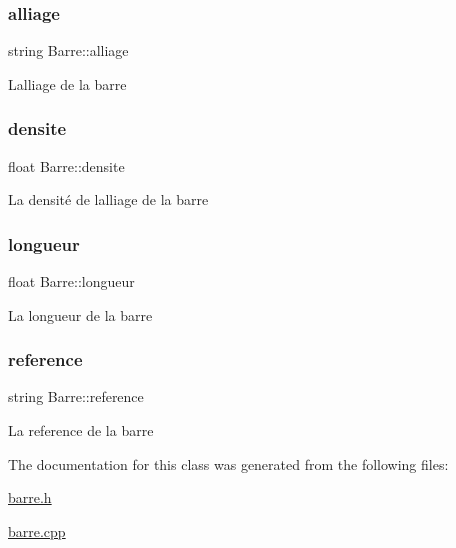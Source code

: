 \subsubsection{\texorpdfstring{alliage}{alliage}}
{\footnotesize\ttfamily string Barre\+::alliage\hspace{0.3cm}{\ttfamily [private]}}

L\textquotesingle{}alliage de la barre \mbox{\label{class_barre_a1ed969f61782b23802f20ff7a5759f8d}} 
\subsubsection{\texorpdfstring{densite}{densite}}
{\footnotesize\ttfamily float Barre\+::densite}

La densité de l\textquotesingle{}alliage de la barre \mbox{\label{class_barre_afbaf5adb5c517bb48c516764e5ff8d6a}} 
\subsubsection{\texorpdfstring{longueur}{longueur}}
{\footnotesize\ttfamily float Barre\+::longueur}

La longueur de la barre \mbox{\label{class_barre_a787dda4b06eba9eac805fc67720d4a11}} 
\subsubsection{\texorpdfstring{reference}{reference}}
{\footnotesize\ttfamily string Barre\+::reference\hspace{0.3cm}{\ttfamily [private]}}

La reference de la barre 

The documentation for this class was generated from the following files\+:\begin{DoxyCompactItemize}
\item 
\hyperlink{barre_8h}{barre.\+h}\item 
\hyperlink{barre_8cpp}{barre.\+cpp}\end{DoxyCompactItemize}
